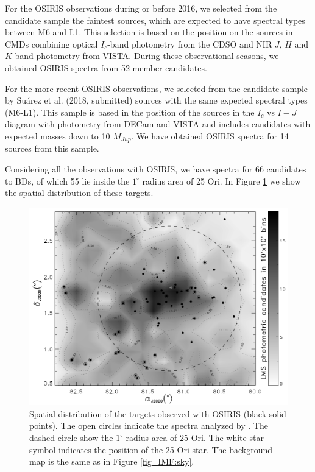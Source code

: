 \documentclass[12pt]{article}
\newcounter{subsubsubsection}[subsubsection]
\begin{document}
\label{sec_OSIRIS:targets}
For the OSIRIS observations during or before 2016, we selected from the \citet{Downes2014} candidate sample the faintest sources, which are expected to have spectral types between M6 and L1. This selection is based on the position on the sources in CMDs combining optical $I_c$-band photometry from the CDSO and NIR $J$, $H$ and $K$-band photometry from VISTA. During these observational seasons, we obtained OSIRIS spectra from 52 member candidates.

For the more recent OSIRIS observations, we selected from the candidate sample by Su\'arez et al. (2018, submitted) sources with the same expected spectral types (M6-L1). This sample is based in the position of the sources in the $I_c$ vs $I-J$ diagram with photometry from DECam and VISTA and includes candidates with expected masses down to 10 $M_{Jup}$. We have obtained OSIRIS spectra for 14 sources from this sample.%

Considering all the observations with OSIRIS, we have spectra for 66 candidates to BDs, of which 55 lie inside the $1^\circ$ radius area of 25 Ori. In Figure \ref{fig_OSIRIS:sky} we show the spatial distribution of these targets. 

\begin{figure}[ht!]
	\includegraphics[width=1.0\textwidth]{sky_OSIRIS.pdf}
	\caption[Spatial distribution of the OSIRIS targets.]{Spatial distribution of the targets observed with OSIRIS (black solid points). The open circles indicate the spectra analyzed by \citet{Downes2015}. The dashed circle show the $1^\circ$ radius area of 25 Ori. The white star symbol indicates the position of the 25 Ori star. The background map is the same as in Figure \ref{fig_IMF:sky}.}
	\label{fig_OSIRIS:sky}
\end{figure}
\end{document}
